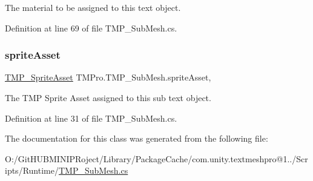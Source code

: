 The material to be assigned to this text object. 



Definition at line 69 of file T\+M\+P\+\_\+\+Sub\+Mesh.\+cs.

\mbox{\label{class_t_m_pro_1_1_t_m_p___sub_mesh_ab5d0012cbff2dc1c416559cc6cf840ec}} 
\subsubsection{\texorpdfstring{spriteAsset}{spriteAsset}}
{\footnotesize\ttfamily \mbox{\hyperlink{class_t_m_pro_1_1_t_m_p___sprite_asset}{T\+M\+P\+\_\+\+Sprite\+Asset}} T\+M\+Pro.\+T\+M\+P\+\_\+\+Sub\+Mesh.\+sprite\+Asset\hspace{0.3cm}{\ttfamily [get]}, {\ttfamily [set]}}



The T\+MP Sprite Asset assigned to this sub text object. 



Definition at line 31 of file T\+M\+P\+\_\+\+Sub\+Mesh.\+cs.



The documentation for this class was generated from the following file\+:\begin{DoxyCompactItemize}
\item 
O\+:/\+Git\+H\+U\+B\+M\+I\+N\+I\+P\+Roject/\+Library/\+Package\+Cache/com.\+unity.\+textmeshpro@1../\+Scripts/\+Runtime/\mbox{\hyperlink{_t_m_p___sub_mesh_8cs}{T\+M\+P\+\_\+\+Sub\+Mesh.\+cs}}\end{DoxyCompactItemize}
